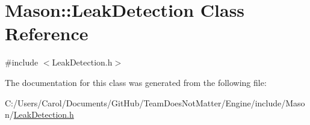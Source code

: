 \hypertarget{class_mason_1_1_leak_detection}{}\section{Mason\+:\+:Leak\+Detection Class Reference}
\label{class_mason_1_1_leak_detection}


{\ttfamily \#include $<$Leak\+Detection.\+h$>$}



The documentation for this class was generated from the following file\+:\begin{DoxyCompactItemize}
\item 
C\+:/\+Users/\+Carol/\+Documents/\+Git\+Hub/\+Team\+Does\+Not\+Matter/\+Engine/include/\+Mason/\hyperlink{_leak_detection_8h}{Leak\+Detection.\+h}\end{DoxyCompactItemize}
